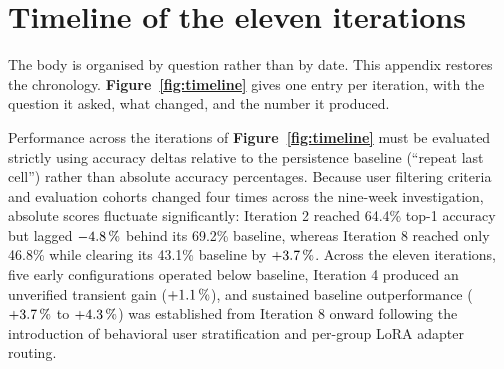 \chapter{Timeline of the eleven iterations}
\label{app:timeline}

The body is organised by question rather than by date. This appendix restores the chronology. \textbf{Figure~\ref{fig:timeline}} gives one entry per iteration, with the question it asked, what changed, and the number it produced.



Performance across the iterations of \textbf{Figure~\ref{fig:timeline}} must be evaluated strictly using accuracy deltas relative to the persistence baseline (``repeat last cell'') rather than absolute accuracy percentages. Because user filtering criteria and evaluation cohorts changed four times across the nine-week investigation, absolute scores fluctuate significantly: Iteration 2 reached 64.4\% top-1 accuracy but lagged $-4.8\,\%$ behind its 69.2\% baseline, whereas Iteration 8 reached only 46.8\% while clearing its 43.1\% baseline by $+3.7\,\%$. Across the eleven iterations, five early configurations operated below baseline, Iteration 4 produced an unverified transient gain ($+1.1\,\%$), and sustained baseline outperformance ($+3.7\,\%$ to $+4.3\,\%$) was established from Iteration 8 onward following the introduction of behavioral user stratification and per-group LoRA adapter routing.
